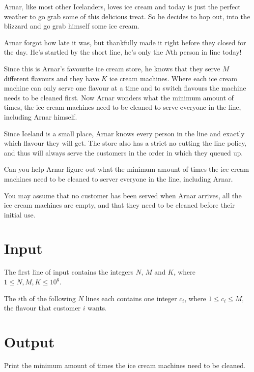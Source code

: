 Arnar, like most other Icelanders, loves ice cream and today is just the perfect
weather to go grab some of this delicious treat. So he decides to hop out, into
the blizzard and go grab himself some ice cream.

Arnar forgot how late it was, but thankfully made it right before they closed
for the day. He's startled by the short line, he's only the $N$th person in
line today!

Since this is Arnar's favourite ice cream store, he knows that they serve $M$
different flavours and they have $K$ ice cream machines.
Where each ice cream machine can only serve one flavour at a time and to switch
flavours the machine needs to be cleaned first.
Now Arnar wonders what the minimum amount of times, the ice cream machines
need to be cleaned to serve everyone in the line, including Arnar himself.

Since Iceland is a small place, Arnar knows every person in the line and exactly
which flavour they will get.
The store also has a strict no cutting the line policy, and thus will always serve
the customers in the order in which they queued up.

Can you help Arnar figure out what the minimum amount of times the ice cream
machines need to be cleaned to server everyone in the line, including Arnar.

You may assume that no customer has been served when Arnar arrives, all the ice
cream machines are empty, and that they need to be cleaned before their initial use.

\section*{Input}
The first line of input contains the integers $N$, $M$ and $K$, where $1 \leq
N, M, K \leq 10^6$.

The $i$th of the following $N$ lines each contains one integer $c_i$,
where $1 \leq c_i \leq M$, the flavour that customer $i$ wants.

\section*{Output}
Print the minimum amount of times the ice cream machines need to be cleaned.

